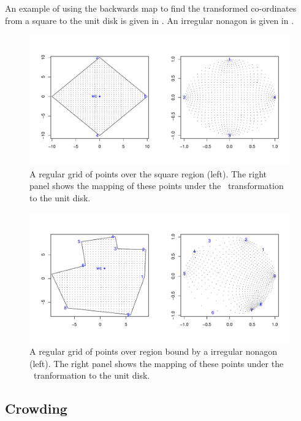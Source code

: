 An example of using the backwards map to find the transformed co-ordinates from a square to the unit disk is given in . An irregular nonagon is given in .


\begin{figure} [bp]
\centering
\includegraphics[scale=0.5]{sc/figs/squaredomain.pdf}
\caption{A regular grid of points over the square region (left). The right panel shows the mapping of these points under the \sch\ transformation to the unit disk.}
\label{squaredomain}
\end{figure}

\begin{figure} [tbp]
\centering
\includegraphics[scale=0.5]{sc/figs/irregulardomain.pdf}
\caption{A regular grid of points over region bound by a irregular nonagon (left). The right panel shows the mapping of these points under the \sch\ tranformation to the unit disk.}
\label{irregdomain}
\end{figure}

\subsection{Crowding}
\label{sch-crowding}

